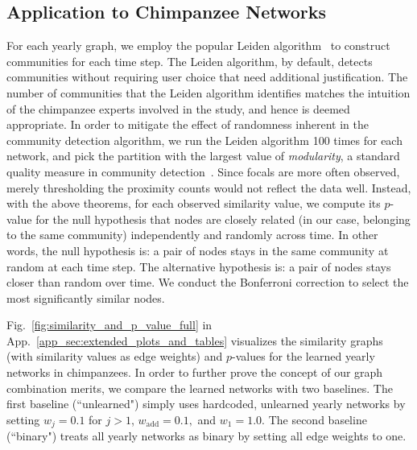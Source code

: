 \documentclass{article}
\theoremstyle{plain}
\theoremstyle{definition}
\theoremstyle{remark}
\begin{document}
\subsection{Application to Chimpanzee Networks}
For each yearly graph, we employ the popular Leiden algorithm~\cite{traag2019louvain} to construct communities for each time step. The Leiden algorithm, by default, detects communities without requiring user choice that need additional justification. The number of communities that the Leiden algorithm identifies matches the intuition of the chimpanzee experts involved in the study, and hence is deemed appropriate. In order to mitigate the effect of randomness inherent in the community detection algorithm, we run the Leiden algorithm 100 times for each network, and pick the partition with the largest value of {\em modularity}, a standard quality measure in community detection~\cite{newman2018networks}. 
Since focals are more often observed, merely thresholding the proximity counts would not reflect the data well. Instead, with the above theorems, for each observed similarity value, we compute its $p$-value for the null hypothesis that nodes are closely related (in our case, belonging to the same community) independently and randomly across time. In other words, the null hypothesis is: a pair of nodes stays in the same community at random at each time step. The alternative hypothesis is: a pair of nodes stays closer than random over time. We conduct the Bonferroni correction to select the most significantly similar nodes.  


Fig.~\ref{fig:similarity_and_p_value_full} in App.~\ref{app_sec:extended_plots_and_tables} visualizes the similarity graphs (with similarity values as edge weights) and $p$-values for the learned yearly networks in chimpanzees. In order to further prove the concept of our graph combination merits, we compare the learned networks with two baselines. The first baseline (``unlearned") simply uses hardcoded, unlearned yearly networks by setting $w_j=0.1$ for $j>1$, $w_\text{add}=0.1,$ and $w_1=1.0$. The second baseline (``binary") treats all yearly networks as binary by setting all edge weights to one.
\end{document}
